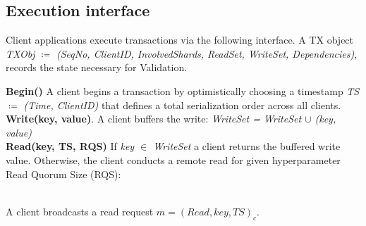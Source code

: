 \subsection{Execution interface}
Client applications execute transactions via the following interface. A TX object \textit{TXObj $\coloneqq$ (SeqNo, ClientID, InvolvedShards, ReadSet, WriteSet, Dependencies)}, records the state necessary for Validation.

\textbf{Begin()} A client begins a transaction by optimistically choosing a timestamp \textit{TS $\coloneqq$ (Time, ClientID)} that defines a total serialization order across all clients.  \\
\textbf{Write(key, value)}. A client buffers the write: \textit{WriteSet = WriteSet $\cup$ (key, value)}\\
\textbf{Read(key, TS, RQS)} 
If \textit{key $\in$ WriteSet} a client returns the buffered write value. Otherwise, the client conducts a remote read for given hyperparameter Read Quorum Size (RQS):

\\
A client broadcasts a read request  $m = (Read, key, TS)_c$.

{}

